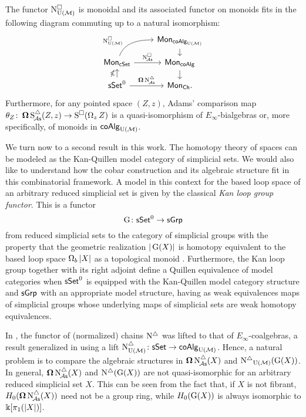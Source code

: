 \begin{theorem} \label{t:1st main thm in the intro}
	The functor $\operatorname{N^{\square}_{{\operatorname{U}(\mathcal{M})}}}$ is monoidal and its associated functor on monoids fits in the following diagram commuting up to a natural isomorphism:
	\[
	\begin{tikzcd} [row sep=small]
	& \Mon_{\coAlg_\UM} \arrow[d] \\
	\Mon_{\cSet} \arrow[ru, "\cchainsUM", out=70, in=180, near start] \arrow[r, "\cchainsA"]
	& \Mon_{\coAlg} \arrow[d] \\
	\sSet^0 \arrow[r, "\cobar \schainsA"] \arrow[u, "\ccobar"]
	& \Mon_{\Ch}.
	\end{tikzcd}
	\]
Furthermore, for any pointed space $(Z,z)$, Adams' comparison map $\theta_Z \colon \operatorname{\mathbf{\Omega}} \operatorname{S^{\triangle}_{\!{\mathcal{A}\mathsf{s}}}}(Z,z) \to \operatorname{S^{\square}}(\operatorname{\Omega}_z Z)$ is a quasi-isomorphism of $E_{\infty}$-bialgebras or, more specifically, of monoids in $\mathsf{coAlg}_{\operatorname{U}(\mathcal{M})}$.

\end{theorem}

We turn now to a second result in this work.
The homotopy theory of spaces can be modeled as the Kan-Quillen model category of simplicial sets.
We would also like to understand how the cobar construction and its algebraic structure fit in this combinatorial framework.
A model in this context for the based loop space of an arbitrary reduced simplicial set is given by the classical \textit{Kan loop group functor}.
This is a functor
\[
\operatorname{G} \colon \mathsf{sSet}^0 \to \mathsf{sGrp}
\]
from reduced simplicial sets to the category of simplicial groups with the property that the geometric realization $|\operatorname{G}(X)|$ is homotopy equivalent to the based loop space $\operatorname{\Omega}_b|X|$ as a topological monoid \cite{berger1995loops}.
Furthermore, the Kan loop group together with its right adjoint define a Quillen equivalence of model categories when $\mathsf{sSet}^0$ is equipped with the Kan-Quillen model category structure and $\mathsf{sGrp}$ with an appropriate model structure, having as weak equivalences maps of simplicial groups whose underlying maps of simplicial sets are weak homotopy equivalences.

In \cite{mcclure2003multivariable, berger2004combinatorial}, the functor of (normalized) chains $\operatorname{N^{\triangle}}$ was lifted to that of $E_{\infty}$-coalgebras, a result generalized in \cite{medina2020prop1} using a lift $\operatorname{N^{\triangle}_{{\operatorname{U}(\mathcal{M})}}} \colon \mathsf{sSet} \to \mathsf{coAlg}_{{\operatorname{U}(\mathcal{M})}}$.
Hence, a natural problem is to compare the algebraic structures in $\operatorname{\mathbf{\Omega}} \operatorname{N^{\triangle}_{\!{\mathcal{A}\mathsf{s}}}}(X)$ and $\operatorname{N^{\triangle}}_{{\operatorname{U}(\mathcal{M})}}(\operatorname{G}(X))$.
In general, $\operatorname{\mathbf{\Omega}} \operatorname{N^{\triangle}_{\!{\mathcal{A}\mathsf{s}}}}(X)$ and $\operatorname{N^{\triangle}}(\operatorname{G}(X))$ are not quasi-isomorphic for an arbitrary reduced simplicial set $X$.
This can be seen from the fact that, if $X$ is not fibrant, $H_0(\operatorname{\mathbf{\Omega}} \operatorname{N^{\triangle}_{\!{\mathcal{A}\mathsf{s}}}}(X))$ need not be a group ring, while $H_0(\operatorname{G}(X))$ is always isomorphic to $ \Bbbk[\pi_1(|X|)]$.

